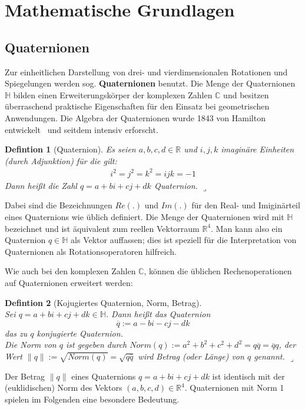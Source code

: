 \newtheorem{defdef}{Defintion}[section]
\newenvironment{definition}[1][]{\begin{defdef}[#1] \normalfont\hspace*{1mm}}{\hfill $\lrcorner$\end{defdef}\vspace{0.2cm}}

\section{Mathematische Grundlagen}
\subsection{Quaternionen}\label{quaternionen}
Zur einheitlichen Darstellung von drei- und vierdimensionalen Rotationen und Spiegelungen werden
sog. \textbf{Quaternionen} benutzt.
Die Menge der Quaternionen $\mathbb{H}$ bilden einen Erweiterungskörper der komplexen Zahlen $\mathbb{C}$ und besitzen überraschend praktische Eigenschaften für den Einsatz bei geometrischen Anwendungen. Die Algebra der Quaternionen wurde 1843 von Hamilton entwickelt~\cite{hazewinkel2004algebras} und seitdem intensiv erforscht.

\begin{definition}[Quaternion]
Es seien $a,b,c,d \in \mathbb{R}$ und $i,j,k$ imaginäre Einheiten (durch Adjunktion) für die gilt:
\begin{equation*}\begin{split}
i^2 = j^2 = k^2 = ijk = -1
\end{split}\end{equation*}
Dann heißt die Zahl $q = a + bi + cj + dk$ Quaternion.
\end{definition}
Dabei sind die Bezeichnungen $Re(.)$ und $Im(.)$ für den Real- und Imiginärteil eines Quaternions wie üblich definiert.
Die Menge der Quaternionen wird mit $\mathbb{H}$ bezeichnet und ist äquivalent zum reellen Vektorraum $\mathbb{R}^4$.
Man kann also ein Quaternion $q \in \mathbb{H}$ als Vektor auffassen; dies ist speziell für die Interpretation von Quaternionen als Rotationsoperatoren hilfreich.

Wie auch bei den komplexen Zahlen $\mathbb{C}$, können die üblichen Rechenoperationen auf Quaternionen erweitert werden:

\begin{definition}[Kojugiertes Quaternion, Norm, Betrag] $\quad$ \\
Sei $q = a + bi + cj + dk \in \mathbb{H}$. Dann heißt das Quaternion
\begin{equation*}
\overline{q} := a - bi - cj - dk
\end{equation*} das zu $q$ konjugierte Quaternion. \\
Die Norm von $q$ ist gegeben durch $Norm(q) := a^2 + b^2 + c^2 + d^2 = q\overline{q} = \overline{q}q$, der Wert
$\| q \| := \sqrt{Norm(q)} = \sqrt{q \overline{q}}$ wird Betrag (oder Länge) von $q$ genannt.
\end{definition}
\noindent Der Betrag $\|q\|$ eines Quaternions $q = a + bi + cj + dk$ ist identisch mit der (euklidischen) Norm des Vektors $(a,b,c,d) \in \mathbb{R}^4$. Quaternionen mit Norm 1 spielen im Folgenden eine besondere Bedeutung.

